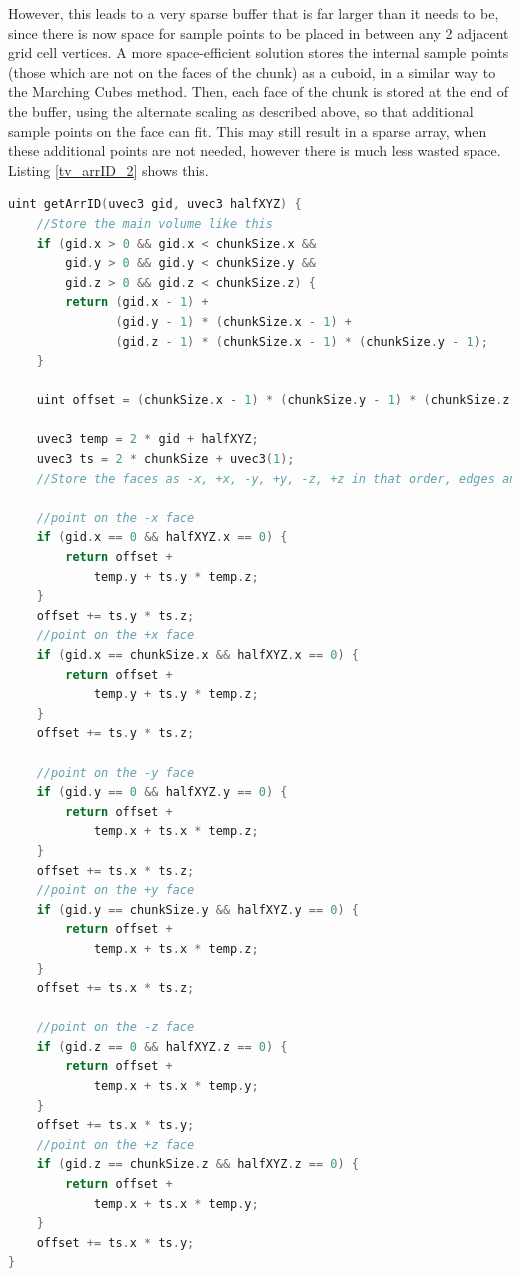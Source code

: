 \documentclass{article}
\begin{document}
However, this leads to a very sparse buffer that is far larger than it needs to be, since there is now space for sample points to be placed in between any 2 adjacent grid cell vertices. A more space-efficient solution stores the internal sample points (those which are not on the faces of the chunk) as a cuboid, in a similar way to the Marching Cubes method. Then, each face of the chunk is stored at the end of the buffer, using the alternate scaling as described above, so that additional sample points on the face can fit. This may still result in a sparse array, when these additional points are not needed, however there is much less wasted space. Listing \ref{tv_arrID_2} shows this.

\begin{lstlisting}[language=C++,label={tv_arrID_2},caption={A more efficient \texttt{getArrID} function for the Transvoxel algorithm}]
  uint getArrID(uvec3 gid, uvec3 halfXYZ) {
    //Store the main volume like this
    if (gid.x > 0 && gid.x < chunkSize.x &&
        gid.y > 0 && gid.y < chunkSize.y &&
        gid.z > 0 && gid.z < chunkSize.z) {
        return (gid.x - 1) +
               (gid.y - 1) * (chunkSize.x - 1) +
               (gid.z - 1) * (chunkSize.x - 1) * (chunkSize.y - 1); 
    }

    uint offset = (chunkSize.x - 1) * (chunkSize.y - 1) * (chunkSize.z - 1);

    uvec3 temp = 2 * gid + halfXYZ;
    uvec3 ts = 2 * chunkSize + uvec3(1);
    //Store the faces as -x, +x, -y, +y, -z, +z in that order, edges and corners are stored in the first place in this ordering (some unpopulated values)

    //point on the -x face
    if (gid.x == 0 && halfXYZ.x == 0) {
        return offset +
            temp.y + ts.y * temp.z;
    }
    offset += ts.y * ts.z;
    //point on the +x face
    if (gid.x == chunkSize.x && halfXYZ.x == 0) {
        return offset +
            temp.y + ts.y * temp.z;
    }
    offset += ts.y * ts.z;

    //point on the -y face
    if (gid.y == 0 && halfXYZ.y == 0) {
        return offset +
            temp.x + ts.x * temp.z;
    }
    offset += ts.x * ts.z;
    //point on the +y face
    if (gid.y == chunkSize.y && halfXYZ.y == 0) {
        return offset +
            temp.x + ts.x * temp.z;
    }
    offset += ts.x * ts.z;

    //point on the -z face
    if (gid.z == 0 && halfXYZ.z == 0) {
        return offset +
            temp.x + ts.x * temp.y;
    }
    offset += ts.x * ts.y;
    //point on the +z face
    if (gid.z == chunkSize.z && halfXYZ.z == 0) {
        return offset +
            temp.x + ts.x * temp.y;
    }
    offset += ts.x * ts.y;
}
\end{lstlisting}
\end{document}

